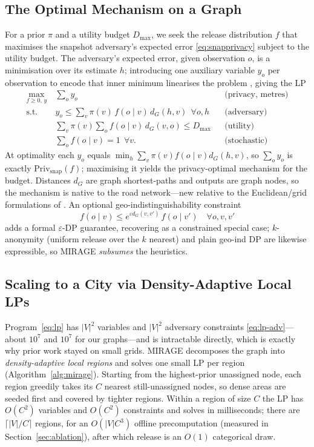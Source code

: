 \documentclass[10pt,journal,compsoc]{IEEEtran}
\newcommand{\dG}{d_{G}}
\begin{document}
\subsection{The Optimal Mechanism on a Graph}
For a prior $\pi$ and a utility budget $D_{\max}$, we seek the release
distribution $f$ that maximises the snapshot adversary's expected error
\eqref{eq:snapprivacy} subject to the utility budget. The adversary's expected
error, given observation $o$, is a minimisation over its estimate $h$; introducing
one auxiliary variable $y_o$ per observation to encode that inner minimum
linearises the problem \cite{shokri2012}, giving the LP
\begin{subequations}\label{eq:lp}
\begin{align}
\max_{f\ge 0,\,y}\ & \sum_{o} y_o &&\text{(privacy, metres)}\\
\text{s.t. }\ & y_o \le \sum_{v}\pi(v)\,f(o\mid v)\,\dG(h,v)\ \ \forall o,h &&\text{(adversary)}\label{eq:lp-adv}\\
& \sum_{v}\pi(v)\sum_{o} f(o\mid v)\,\dG(v,o)\le D_{\max} &&\text{(utility)}\\
& \sum_{o} f(o\mid v)=1\ \ \forall v. &&\text{(stochastic)}
\end{align}
\end{subequations}
At optimality each $y_o$ equals $\min_h\sum_v \pi(v)f(o\mid v)\dG(h,v)$, so
$\sum_o y_o$ is exactly $\mathrm{Priv}_{\mathrm{snap}}(f)$; maximising it yields
the privacy-optimal mechanism for the budget. Distances $\dG$ are graph
shortest-paths and outputs are graph nodes, so the mechanism is native to the road
network---new relative to the Euclidean/grid formulations of
\cite{shokri2012,bordenabe2014}. An optional geo-indistinguishability constraint
\begin{equation}
f(o\mid v)\le e^{\varepsilon \dG(v,v')}\,f(o\mid v')\quad\forall o,v,v'
\label{eq:geoind}
\end{equation}
adds a formal $\varepsilon$-DP guarantee, recovering \cite{bordenabe2014} as a
constrained special case; $k$-anonymity (uniform release over the $k$ nearest) and
plain geo-ind DP are likewise expressible, so MIRAGE \emph{subsumes} the
heuristics.

\subsection{Scaling to a City via Density-Adaptive Local LPs}
Program~\eqref{eq:lp} has $|V|^2$ variables and $|V|^2$ adversary constraints
\eqref{eq:lp-adv}---about $10^7$ and $10^7$ for our graphs---and is intractable
directly, which is exactly why prior work stayed on small grids. MIRAGE
decomposes the graph into \emph{density-adaptive local regions} and solves one
small LP per region (Algorithm~\ref{alg:mirage}). Starting from the highest-prior
unassigned node, each region greedily takes its $C$ nearest still-unassigned
nodes, so dense areas are seeded first and covered by tighter regions. Within a
region of size $C$ the LP has $O(C^2)$ variables and $O(C^2)$ constraints and
solves in milliseconds; there are $\lceil|V|/C\rceil$ regions, for an
$O(|V|C^3)$ offline precomputation (measured in Section~\ref{sec:ablation}), after
which release is an $O(1)$ categorical draw.
\end{document}
